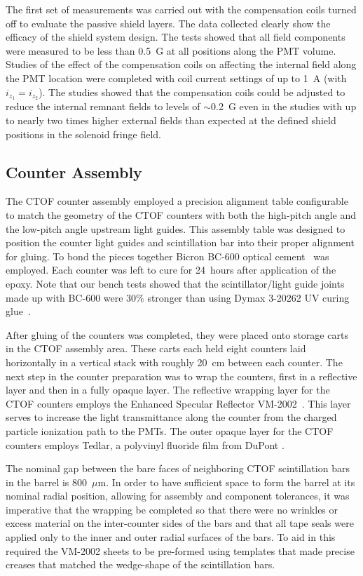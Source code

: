\documentclass{elsart}
\begin{document}
The first set of measurements was carried out with the compensation coils turned off to evaluate
the passive shield layers. The data collected clearly show the efficacy of the shield system design.
The tests showed that all field components were measured to be less than 0.5~G at all positions
along the PMT volume. Studies of the effect of the compensation coils on affecting the internal field
along the PMT location were completed with coil current settings of up to 1~A (with $i_{z_1} = i_{z_2}$).
The studies showed that the compensation coils could be adjusted to reduce the internal remnant
fields to levels of $\sim$0.2~G even in the studies with up to nearly two times higher external fields
than expected at the defined shield positions in the solenoid fringe field.

\subsection{Counter Assembly}
\label{assembly}
           
The CTOF counter assembly employed a precision alignment table configurable to match the geometry
of the CTOF counters with both the high-pitch angle and the low-pitch angle upstream light guides. This
assembly table was designed to position the counter light guides and scintillation bar into their proper
alignment for gluing. To bond the pieces together Bicron BC-600 optical cement~\cite{bc600-ref} was
employed. Each counter was left to cure for 24~hours after application of the epoxy. Note that our
bench tests showed that the scintillator/light guide joints made up with BC-600 were 30\% stronger
than using Dymax 3-20262 UV curing glue~\cite{dymax}.

After gluing of the counters was completed, they were placed onto storage carts in the CTOF assembly
area. These carts each held eight counters laid horizontally in a vertical stack with roughly 20~cm
between each counter. The next step in the counter preparation was to wrap the counters, first in a 
reflective layer and then in a fully opaque layer. The reflective wrapping layer for the CTOF counters
employs the Enhanced Specular Reflector VM-2002~\cite{vm2002-ref}. This layer serves to increase
the light transmittance along the counter from the charged particle ionization path to the PMTs. The
outer opaque layer for the CTOF counters employs Tedlar, a polyvinyl fluoride film from DuPont
\cite{dupont-ref}.

The nominal gap between the bare faces of neighboring CTOF scintillation bars in the barrel is
800~$\mu$m. In order to have sufficient space to form the barrel at its nominal radial position, allowing
for assembly and component tolerances, it was imperative that the wrapping be completed so that there
were no wrinkles or excess material on the inter-counter sides of the bars and that all tape seals were
applied only to the inner and outer radial surfaces of the bars. To aid in this required the VM-2002 sheets
to be pre-formed using templates that made precise creases that matched the wedge-shape of the
scintillation bars.
\end{document}
